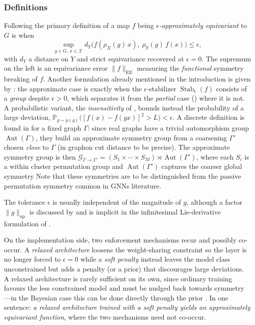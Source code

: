 \documentclass[mathematics,review,submit,moreauthors]{Definitions/mdpi}
\begin{document}
\subsubsection{Definitions}
Following \citep{wang2022p3icml,sipiran202523scgpis,ali2026} the primary definition of a map $f$ being \emph{$\epsilon$-approximately equivariant} to $G$ is when
\begin{equation}\label{eq:equiv-error-approximate}
    \sup_{g\in G,\,x\in \mathcal{X}} d_Y\big(f(\rho_X(g)\,x),\ \rho_Y(g)\,f(x)\big)\le \epsilon,
\end{equation}
with $d_Y$ a distance on $Y$ and strict equivariance recovered at $\epsilon=0$.
The supremum on the left is an equivariance error $\|f\|_{\mathrm{EE}}$ measuring the \emph{functional} symmetry breaking of $f$.
Another formulation already mentioned in the introduction is given by \citet{petrache2023}: the approximate case is exactly when the $\epsilon$-stabilizer $\operatorname{Stab}_\epsilon(f)$ consists of a \emph{group} despite $\epsilon>0$, which separates it from the \emph{partial} case () where it is not.
A probabilistic variant, the \emph{insensitivity} of \citet{vanderwilk2018anips}, bounds instead the probability of a large deviation, $\mathbb{P}_{g\sim p(g)}\big([f(x)-f(gx)]^2>L\big)<\epsilon$.
A discrete definition is found in \citet{huang2023} for a fixed graph $\Gamma$: since real graphs have a trivial automorphism group $\operatorname{Aut}(\Gamma)$, they build an approximate symmetry group from a coarsening $\Gamma'$ chosen \textit{close} to $\Gamma$ (in graphon cut distance to be precise).
The approximate symmetry group is then $\mathcal{G}_{\Gamma\to\Gamma'}=(S_1\times\cdots\times S_M)\rtimes\operatorname{Aut}(\Gamma')$, where each $S_i$ is a within cluster permutation group and $\operatorname{Aut}(\Gamma')$ captures the coarser global symmetry
Note that these symmetries are to be distinguished from the passive permutation symmetry common in GNNs literature.

\begin{Remark}
    The tolerance $\epsilon$ is usually independent of the magnitude of $g$, although a factor $\|g\|_{\mathrm{op}}$ is discussed by \citet{wang2022p3icml} and is implicit in the infinitesimal Lie-derivative formulation of \citet{pertigkiozoglou2024}.
\end{Remark}

On the implementation side, two enforcement mechanisms recur and possibly co-occur.
A \emph{relaxed architecture} loosens the weight-sharing constraint so the layer is no longer forced to $\epsilon=0$ while a \emph{soft penalty} instead leaves the model class unconstrained but adds a penalty (or a prior) that discourages large deviations.
A relaxed architecture is rarely sufficient on its own, since ordinary training favours the less constrained model and must be nudged back towards symmetry \citep{ouderaa2022,wang2022p3icml}---in the Bayesian case this can be done directly through the prior \citep{vanderwilk2018anips,ouderaa2023}.
In one sentence: \emph{a relaxed architecture trained with a soft penalty yields an approximately equivariant function}, where the two mechanisms need not co-occur.
\end{document}
